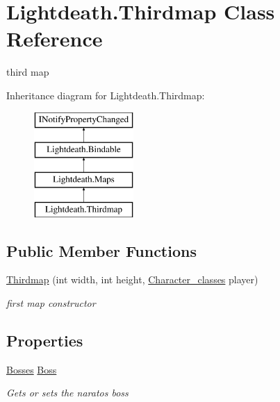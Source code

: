 \hypertarget{class_lightdeath_1_1_thirdmap}{}\section{Lightdeath.\+Thirdmap Class Reference}
\label{class_lightdeath_1_1_thirdmap}


third map  


Inheritance diagram for Lightdeath.\+Thirdmap\+:\begin{figure}[H]
\begin{center}
\leavevmode
\includegraphics[height=4.000000cm]{class_lightdeath_1_1_thirdmap}
\end{center}
\end{figure}
\subsection*{Public Member Functions}
\begin{DoxyCompactItemize}
\item 
\hyperlink{class_lightdeath_1_1_thirdmap_a30c3403e5d0d4d0350f1c4d201854e3a}{Thirdmap} (int width, int height, \hyperlink{class_lightdeath_1_1_character__classes}{Character\+\_\+classes} player)
\begin{DoxyCompactList}\small\item\em first map constructor \end{DoxyCompactList}\end{DoxyCompactItemize}
\subsection*{Properties}
\begin{DoxyCompactItemize}
\item 
\hyperlink{class_lightdeath_1_1_bosses}{Bosses} \hyperlink{class_lightdeath_1_1_thirdmap_a3684f4f518bbad3d73c2df6ed1d1df17}{Boss}
\begin{DoxyCompactList}\small\item\em Gets or sets the naratos boss \end{DoxyCompactList}\end{DoxyCompactItemize}

